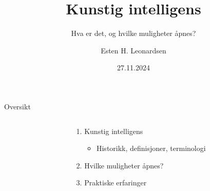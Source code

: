 \documentclass[aspectratio=169]{beamer}
\title{Kunstig intelligens}
\subtitle{Hva er det, og hvilke muligheter åpnes?}
\date{27.11.2024}
\author{Esten H. Leonardsen}
\begin{document}
    \begin{frame}
        \titlepage
    \end{frame}

    \begin{frame}{Oversikt}
        \begin{columns}
            \begin{column}{0.3\textwidth}
            \end{column}
            \begin{column}{0.7\textwidth}
                \begin{enumerate}
                    \item Kunstig intelligens
                    \begin{itemize}
                        \item Historikk, definisjoner, terminologi
                    \end{itemize}
                    \item Hvilke muligheter åpnes?
                    \item Praktiske erfaringer
                \end{enumerate}
            \end{column}
        \end{columns}
    \end{frame}
\end{document}
